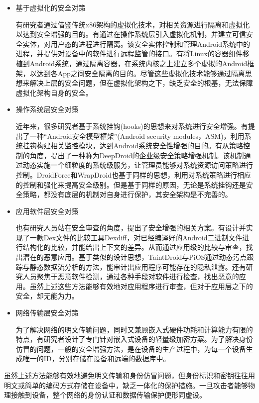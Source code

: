 \documentclass[12pt, a4paper]{article}
\begin{document}
	\begin{itemize}
		
		\item 基于虚拟化的安全对策
		
		有研究者通过借鉴传统x86架构的虚拟化技术，对相关资源进行隔离和虚拟化以达到安全增强的目的。有通过在操作系统层引入虚拟化机制，并建立可信安全实体，对用户态的进程进行隔离。该安全实体控制和管理Android系统中的进程，并提供对设备中的软件进行远程监管的接口。有将Linux的容器组件移植到Android系统，通过隔离容器，在系统内核之上建立多个虚拟的Android框架，以达到各App之间安全隔离的目的。尽管这些虚拟化技术能够通过隔离思想来解决上层的安全问题，但在虚拟化架构之下，缺乏安全的根基，无法保障虚拟化架构自身的安全。
		
		\item 操作系统层安全对策
		
		近年来，很多研究者基于系统挂钩(hooks)的思想来对系统进行安全增强。有提出了一种“Android安全模型框架”(Android security modules，ASM)，利用系统挂钩构建相关监控模块，达到Android系统安全性增强的目的。有从策略控制的角度，提出了一种称为DeepDroid的企业级安全策略增强机制。该机制通过动态实施一个细粒度的系统级服务，让管理员能够对系统资源访问策略进行控制。DroidForce和WrapDroid也基于同样的思想，利用对系统策略进行相应的控制和强化来提高安全级别。但是基于同样的原因，无论是系统挂钩还是安全策略，都没有底层的机制对自身进行保护，其安全架构是不完善的。
		
		\item 应用软件层安全对策
		
		也有研究人员站在安全审查的角度，提出了安全增强的相关方案。有设计并实现了一款Dex文件的比较工具Dexdiff，对已经编译好的Android二进制文件进行结构化的比较，并能给出上下文的差异。从而通过应用级的比较与审查，找出潜在的恶意应用。基于类似的设计思想，TaintDroid与PiOS通过动态污点跟踪与静态数据流分析的方法，能审计出应用程序可能存在的隐私泄露。还有研究人员聚焦于恶意软件检测，通过各种手段对软件进行检查，找出恶意的应用。虽然上述这些方法能够有效地对应用程序进行审查，但对于应用层之下的安全，却无能为力。
		
		\item 网络传输层安全对策
		
		为了解决网络的明文传输问题，同时又兼顾嵌入式硬件功耗和计算能力有限的特点，有研究者设计了专门针对嵌入式设备的轻量级加密方案。为了解决身份仿冒的问题，一般的安全增强方法，是在设备的生产过程中，为每一个设备生成唯一的ID，分别存储在设备和远端的数据库中。
		
	\end{itemize}
	虽然上述方法能够有效地避免明文传输和身份仿冒问题，但身份标识和密钥往往用明文或简单的编码方式存储在设备中，缺乏一体化的保护措施。一旦攻击者能够物理接触到设备，整个网络的身份认证和数据传输保护便形同虚设。	
	
\end{document}
